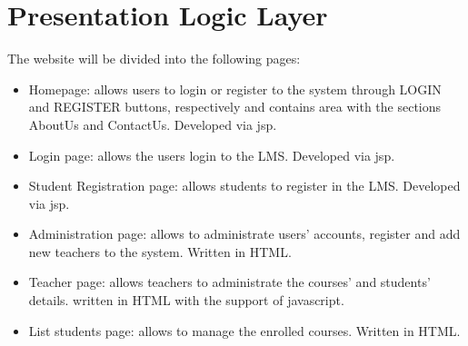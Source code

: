 \newpage
\section{Presentation Logic Layer}
\graphicspath{ {./HW_1/images/} }

The website will be divided into the following pages:
\begin{itemize}
    \item Homepage: allows users to login or register to the system through LOGIN and REGISTER buttons, respectively and contains area with the sections AboutUs and ContactUs. Developed via jsp.
    \item Login page: allows the users login to the LMS. Developed via jsp.
    \item Student Registration page: allows students to register in the LMS. Developed via jsp.
    \item Administration page: allows to administrate users’ accounts, register and add new teachers to the system. Written in HTML.
    \item Teacher page: allows teachers to administrate the courses' and students' details. written in HTML with the
support of javascript.
    \item List students page: allows to manage the enrolled courses. Written in HTML.

\end{itemize}







